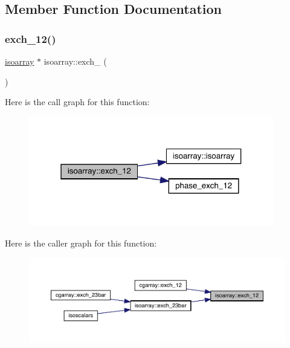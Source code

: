 \subsection{Member Function Documentation}
\mbox{\label{classisoarray_acf019b3f53c42d35326ae81399cd556f}} 
\subsubsection{\texorpdfstring{exch\_12()}{exch\_12()}\hspace{0.1cm}{\footnotesize\ttfamily [1/3]}}
{\footnotesize\ttfamily \mbox{\hyperlink{classisoarray}{isoarray}} $\ast$ isoarray\+::exch\+\_ (\begin{DoxyParamCaption}{ }\end{DoxyParamCaption})}

Here is the call graph for this function\+:
\nopagebreak
\begin{figure}[H]
\begin{center}
\leavevmode
\includegraphics[width=304pt]{d5/dd9/classisoarray_acf019b3f53c42d35326ae81399cd556f_cgraph}
\end{center}
\end{figure}
Here is the caller graph for this function\+:
\nopagebreak
\begin{figure}[H]
\begin{center}
\leavevmode
\includegraphics[width=350pt]{d5/dd9/classisoarray_acf019b3f53c42d35326ae81399cd556f_icgraph}
\end{center}
\end{figure}
\mbox{\label{classisoarray_ac56742183c8846ff2a5b315d1fc0b90b}} 
